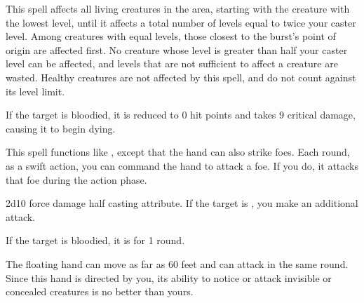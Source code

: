 \begin{spelleffect}
    This spell affects all \bloodied living creatures in the area, starting with the creature with the lowest level, until it affects a total number of levels equal to twice your caster level. Among creatures with equal levels, those closest to the burst's point of origin are affected first. No creature whose level is greater than half your caster level can be affected, and levels that are not sufficient to affect a creature are wasted. Healthy creatures are not affected by this spell, and do not count against its level limit.
\end{spelleffect}
\begin{spellsuccess}
    If the target is bloodied, it is reduced to 0 hit points and takes 9 critical damage, causing it to begin dying.
\end{spellsuccess}

\begin{spelleffect}
    This spell functions like , except that the hand can also strike foes. Each round, as a swift action, you can command the hand to attack a foe. If you do, it attacks that foe during the action phase.
\end{spelleffect}
\begin{spellsuccess}
    2d10 force damage \add half casting attribute. If the target is \bloodied, you make an additional attack.
\end{spellsuccess}
\begin{spellsuccess}
    If the target is bloodied, it is \dazed for 1 round.
\end{spellsuccess}
\begin{spellnotes}
    The floating hand can move as far as 60 feet and can attack in the same round. Since this hand is directed by you, its ability to notice or attack invisible or concealed creatures is no better than yours.
\end{spellnotes}

